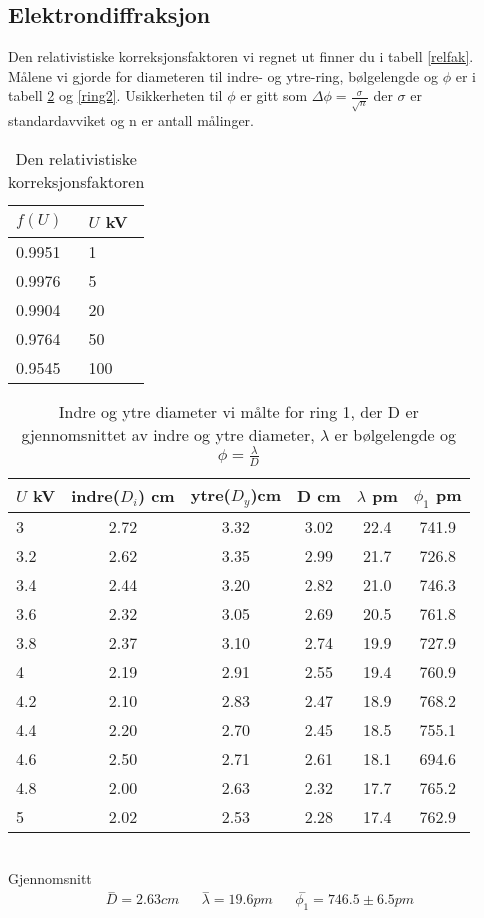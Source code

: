 \documentclass[norsk,a4paper,12pt]{article}
\begin{document}
\newpage
\subsection{Elektrondiffraksjon}
Den relativistiske korreksjonsfaktoren vi regnet ut finner du i tabell \vref{relfak}. Målene vi gjorde for diameteren til indre- og ytre-ring, bølgelengde og $\phi$ er i tabell \ref{ring1} og \vref{ring2}. Usikkerheten til $\phi$ er gitt som $\Delta\phi = \frac{\sigma}{\sqrt{n}}$ der $\sigma$ er standardavviket og n er antall målinger. 
\begin{table}
\centering
\caption[Relativistisk korreksjonsfaktor $f(U)$]{Den relativistiske korreksjonsfaktoren}
	\begin{tabular}{| l | l |}
	\hline
	$f(U)$ & $U$ kV\\ 
	\hline
	0.9951 & 1 \\
	0.9976 & 5 \\
	0.9904 & 20 \\
	0.9764 & 50 \\
	0.9545 & 100 \\
	\hline
	\end{tabular}
\label{relfak}
\end{table}

\begin{table}
\centering
\caption[Diameter ring 1]{Indre og ytre diameter vi målte for ring 1, der D er gjennomsnittet av indre og ytre diameter, $\lambda$ er bølgelengde og $\phi = \frac{\lambda}{D}$}
	\begin{tabular}{| l | c | c | c | c | c |}
	\hline
	$U$ kV & indre($D_i$) cm & ytre($D_y$)cm & D cm & $\lambda$ pm & $\phi_1$ pm\\ 
	\hline
	3 & 2.72 & 3.32 & 3.02 & 22.4 & 741.9\\
	3.2 & 2.62 & 3.35 & 2.99 & 21.7 & 726.8\\
	3.4 & 2.44 & 3.20 & 2.82 & 21.0 & 746.3\\
	3.6 & 2.32 & 3.05 & 2.69 & 20.5 & 761.8\\
	3.8 & 2.37 & 3.10 & 2.74 & 19.9 & 727.9\\
	4 & 2.19 & 2.91 & 2.55 & 19.4 & 760.9\\
	4.2 & 2.10 & 2.83 & 2.47 & 18.9 & 768.2\\
	4.4 & 2.20 & 2.70 & 2.45 & 18.5 & 755.1\\
	4.6 & 2.50 & 2.71 & 2.61 & 18.1 & 694.6\\
	4.8 & 2.00 & 2.63 & 2.32 & 17.7 & 765.2\\
	5 & 2.02 & 2.53 & 2.28 & 17.4 & 762.9\\
	\hline
	\end{tabular}\\
	Gjennomsnitt
	\begin{align*}
	\overset{-}{D} = 2.63 cm && \overset{-}{\lambda} = 19.6 pm 
	&& \overset{-}{\phi_1} = 746.5 \pm 6.5 pm
	\end{align*}
\label{ring1}
\end{table}
\end{document}
